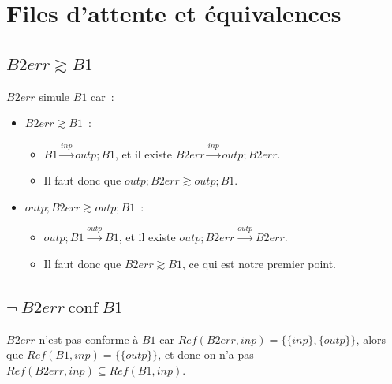 \documentclass[a4paper,french,12pt]{article}
\def\transition#1{\stackrel{#1}{\longrightarrow}}
\def\conf{\ \text{conf}\ }
\let\simule\gtrsim
\begin{document}
\section{Files d'attente et équivalences}
\subsection{$B2err\simule B1$}

$B2err$ simule $B1$ car~:
\begin{itemize}
\item $B2err \simule B1$~:
  \begin{itemize}
  \item $B1\transition{inp} outp;B1$, et il existe $B2err\transition{inp}outp;B2err$.
  \item Il faut donc que $outp;B2err \simule outp;B1$.
  \end{itemize}
\item $outp;B2err \simule outp;B1$~:
  \begin{itemize}
  \item $outp;B1\transition{outp}B1$, et il existe $outp;B2err\transition{outp}B2err$.
  \item Il faut donc que $B2err \simule B1$, ce qui est notre premier point.
  \end{itemize}
\end{itemize}

\subsection{$\neg\ B2err\conf B1$}
$B2err$ n'est pas conforme à $B1$ car $Ref(B2err, inp) = \{\{inp\}, \{outp\}\}$, alors que $Ref(B1,inp) = \{\{outp\}\}$,
et donc on n'a pas $Ref(B2err, inp) \subseteq Ref(B1, inp)$.
\end{document}
